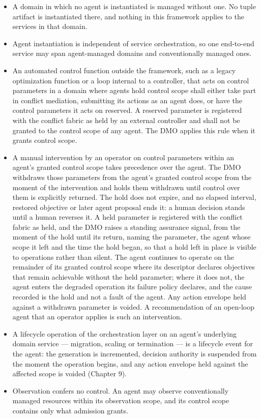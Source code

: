 \begin{itemize}
\tightlist
\item
  A domain in which no agent is instantiated is managed without one. No
  tuple artifact is instantiated there, and nothing in this framework
  applies to the services in that domain.
\item
  Agent instantiation is independent of service orchestration, so one
  end-to-end service may span agent-managed domains and conventionally
  managed ones.
\item
  An automated control function outside the framework, such as a legacy
  optimization function or a loop internal to a controller, that acts on
  control parameters in a domain where agents hold control scope shall
  either take part in conflict mediation, submitting its actions as an
  agent does, or have the control parameters it acts on reserved. A
  reserved parameter is registered with the conflict fabric as held by
  an external controller and shall not be granted to the control scope
  of any agent. The DMO applies this rule when it grants control scope.
\item
  A manual intervention by an operator on control parameters within an
  agent's granted control scope takes precedence over the agent. The DMO
  withdraws those parameters from the agent's granted control scope from
  the moment of the intervention and holds them withdrawn until control
  over them is explicitly returned. The hold does not expire, and no
  elapsed interval, restored objective or later agent proposal ends it:
  a human decision stands until a human reverses it. A held parameter is
  registered with the conflict fabric as held, and the DMO raises a
  standing assurance signal, from the moment of the hold until its
  return, naming the parameter, the agent whose scope it left and the
  time the hold began, so that a hold left in place is visible to
  operations rather than silent. The agent continues to operate on the
  remainder of its granted control scope where its descriptor declares
  objectives that remain achievable without the held parameter; where it
  does not, the agent enters the degraded operation its failure policy
  declares, and the cause recorded is the hold and not a fault of the
  agent. Any action envelope held against a withdrawn parameter is
  voided. A recommendation of an open-loop agent that an operator
  applies is such an intervention.
\item
  A lifecycle operation of the orchestration layer on an agent's
  underlying domain service --- migration, scaling or termination --- is
  a lifecycle event for the agent: the generation is incremented,
  decision authority is suspended from the moment the operation begins,
  and any action envelope held against the affected scope is voided
  (Chapter 9).
\item
  Observation confers no control. An agent may observe conventionally
  managed resources within its observation scope, and its control scope
  contains only what admission grants.
\end{itemize}

